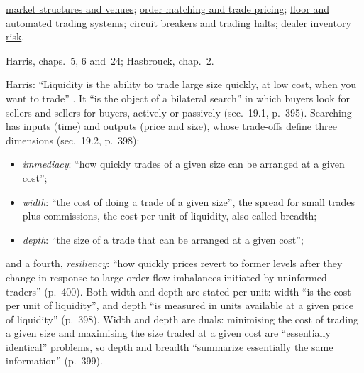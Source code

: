 \begin{qfdefinition}
 \hyperref[def:market-structures-venues]{market structures and venues}; \hyperref[mech:order-matching-pricing]{order matching and trade pricing}; \hyperref[def:floor-automated-trading-systems]{floor and automated trading systems}; \hyperref[mech:circuit-breakers-trading-halts]{circuit breakers and trading halts}; \hyperref[def:dealer-inventory-risk]{dealer inventory risk}.

 Harris, chaps.~5, 6 and~24; Hasbrouck, chap.~2.

\end{qfdefinition}

\begin{qfdefinition}\label{def:liquidity-dimensions}
 Harris: ``Liquidity is the ability to trade large size quickly, at low cost, when you want to trade'' \citep[chap.~19, p.~394]{alpha-harris}. It ``is the object of a bilateral search'' in which buyers look for sellers and sellers for buyers, actively or passively (sec.~19.1, p.~395). Searching has inputs (time) and outputs (price and size), whose trade-offs define three dimensions (sec.~19.2, p.~398):
\begin{itemize}
\item \emph{immediacy}: ``how quickly trades of a given size can be arranged at a given cost'';
\item \emph{width}: ``the cost of doing a trade of a given size'', the spread for small trades plus commissions, the cost per unit of liquidity, also called breadth;
\item \emph{depth}: ``the size of a trade that can be arranged at a given cost'';
\end{itemize}
and a fourth, \emph{resiliency}: ``how quickly prices revert to former levels after they change in response to large order flow imbalances initiated by uninformed traders'' (p.~400). Both width and depth are stated per unit: width ``is the cost per unit of liquidity'', and depth ``is measured in units available at a given price of liquidity'' (p.~398). Width and depth are duals: minimising the cost of trading a given size and maximising the size traded at a given cost are ``essentially identical'' problems, so depth and breadth ``summarize essentially the same information'' (p.~399).


\end{qfdefinition}
